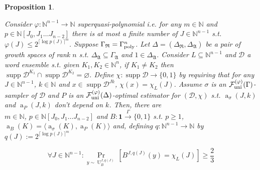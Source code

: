 \documentclass[11pt]{article}
\numberwithin{equation}{section}
\theoremstyle{definition}
\theoremstyle{plain}
\newtheorem{proposition}{Proposition}[section]
\newcommand{\Bool}{\{0,1\}}
\DeclareMathOperator{\Supp}{supp}
\DeclareMathOperator{\Prb}{Pr}
\DeclareMathOperator{\A}{a}
\DeclareMathOperator{\Un}{U}
\newcommand{\Nats}{\mathbb{N}}
\newcommand{\NatPolyJ}{\Nats[J_0, J_1 \ldots J_{n-2}]}
\newcommand{\Ceil}[1]{\lceil #1 \rceil}
\newcommand{\Chev}[1]{\langle #1 \rangle}
\newcommand{\Dist}{\mathcal{D}}
\newcommand{\GrowR}{\Gamma_{\mathfrak{R}}}
\newcommand{\GrowA}{\Gamma_{\mathfrak{A}}}
\newcommand{\Fall}{\mathcal{F}}
\newcommand{\GammaPoly}{\Gamma_{\textnormal{poly}}}
\newcommand{\FallUt}[1]{{\Fall_{\textnormal{uni}}^{(#1)}}}
\newcommand{\Scheme}{\xrightarrow{\Gamma}}
\begin{document}
\begin{samepage}
\begin{proposition}
\label{prp:tally_fall_uni}

Consider ${\varphi: \Nats^{n-1} \rightarrow \Nats}$ superquasi-polynomial i.e. for any ${m \in \Nats}$ and\\ ${p \in \NatPolyJ}$ there is at most a finite number of ${J \in \Nats^{n-1}}$ s.t. ${\varphi(J) \leq 2^{\Ceil{\log p(J)}^m}}$. Suppose ${\GrowR  = \GammaPoly^n}$. Let ${\Delta=(\Delta_{\mathfrak{R}}, \Delta_{\mathfrak{A}})}$ be a pair of growth spaces of rank ${n}$ s.t. ${\Delta_{\mathfrak{A}} \subseteq \GrowA}$ and ${1 \in \Delta_{\mathfrak{A}}}$. Consider ${L \subseteq \Nats^{n-1}}$ and ${\Dist}$ a word ensemble s.t. given ${K_1, K_2 \in \Nats^n}$, if ${K_1 \ne K_2}$ then ${\Supp \Dist^{K_1} \cap \Supp \Dist^{K_2} = \varnothing}$. Define ${\chi: \Supp \Dist \rightarrow \Bool}$ by requiring that for any ${J \in \Nats^{n-1}}$, ${k \in \Nats}$ and ${x \in \Supp \Dist^{Jk}}$, ${\chi(x)=\chi_L(J)}$. Assume ${\sigma}$ is an ${\FallUt{\varphi}(\Gamma)}$-sampler of ${\Dist}$ and ${P}$ is an ${\FallUt{\varphi}(\Delta)}$-optimal estimator for ${(\Dist, \chi)}$ s.t. ${\A_\sigma(J,k)}$ and ${\A_P(J,k)}$ don't depend on ${k}$. Then, there are\\ $m \in \Nats$, ${p \in \NatPolyJ}$ and ${B: \bm{1} \Scheme \Bool}$ s.t. ${p \geq 1}$, ${\A_B(K)=\Chev{\A_\sigma(K),\A_P(K)}}$ and, defining ${q: \Nats^{n-1} \rightarrow \Nats}$ by ${q(J):=2^{\Ceil{\log p(J)}^m}}$

\begin{equation}
\label{eqn:prp__tally_fall_uni}
\forall J \in \Nats^{n-1}:\Prb_{y \sim \Un_B^{J,q(J)}}[B^{J,q(J)}(y)=\chi_L(J)] \geq \frac{2}{3}
\end{equation}

\end{proposition}
\end{samepage}
\end{document}
